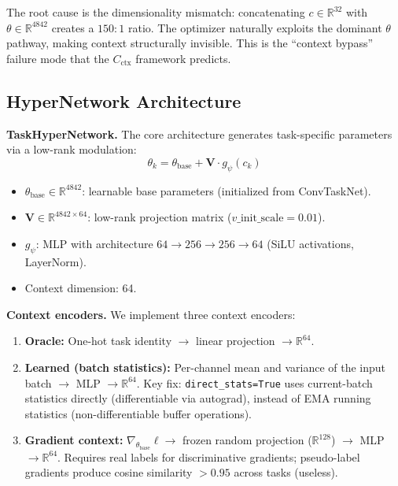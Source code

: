 \documentclass{article}
\begin{document}
The root cause is the dimensionality mismatch: concatenating $c \in \mathbb{R}^{32}$ with $\theta \in \mathbb{R}^{4842}$ creates a $150{:}1$ ratio. The optimizer naturally exploits the dominant $\theta$ pathway, making context structurally invisible. This is the ``context bypass'' failure mode that the $C_\mathrm{ctx}$ framework predicts.


\subsection{HyperNetwork Architecture}
\label{app:hypernet}

\textbf{TaskHyperNetwork.}
The core architecture generates task-specific parameters via a low-rank modulation:
\begin{equation}
    \theta_k = \theta_\mathrm{base} + \mathbf{V} \cdot g_\psi(c_k)
\end{equation}
\begin{itemize}
    \item $\theta_\mathrm{base} \in \mathbb{R}^{4842}$: learnable base parameters (initialized from ConvTaskNet).
    \item $\mathbf{V} \in \mathbb{R}^{4842 \times 64}$: low-rank projection matrix ($v\_\text{init\_scale} = 0.01$).
    \item $g_\psi$: MLP with architecture $64 \to 256 \to 256 \to 64$ (SiLU activations, LayerNorm).
    \item Context dimension: 64.
\end{itemize}

\textbf{Context encoders.}
We implement three context encoders:
\begin{enumerate}
    \item \textbf{Oracle:} One-hot task identity $\to$ linear projection $\to \mathbb{R}^{64}$.
    \item \textbf{Learned (batch statistics):} Per-channel mean and variance of the input batch $\to$ MLP $\to \mathbb{R}^{64}$. Key fix: \texttt{direct\_stats=True} uses current-batch statistics directly (differentiable via autograd), instead of EMA running statistics (non-differentiable buffer operations).
    \item \textbf{Gradient context:} $\nabla_{\theta_\mathrm{base}} \ell \to$ frozen random projection ($\mathbb{R}^{128}$) $\to$ MLP $\to \mathbb{R}^{64}$. Requires real labels for discriminative gradients; pseudo-label gradients produce cosine similarity $> 0.95$ across tasks (useless).
\end{enumerate}
\end{document}
